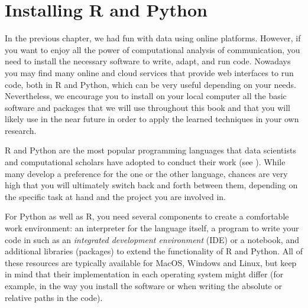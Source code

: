 \section{Installing R and Python}
\label{sec:installing}

In the previous chapter, we had fun with data using online platforms.
However, if you want to enjoy all the power of computational analysis
of communication, you need to install the necessary software to write,
adapt, and run code. Nowadays you may find many online and cloud
services that provide web interfaces to run code, both in R and
Python, which can be very useful depending on your
needs. Nevertheless, we encourage you to install on your local
computer all the basic software and packages that we will use
throughout this book and that you will likely use in the near future
in order to apply the learned techniques in your own research.

R and Python are the most popular programming languages that data
scientists and computational scholars have adopted to conduct their
work (see ). While many develop a preference
for the one or the other language, chances are very high that you
will ultimately switch back and forth between them, depending on
the specific task at hand and the project you are involved in.

For Python as well as R, you need several components to create a
comfortable work environment: an interpreter for the language itself,
a program to write your code in such as an \emph{integrated
  development environment} (IDE) or a notebook, and additional
libraries (packages) to extend the functionality of R and Python.  All
of these resources are typically available for MacOS, Windows and
Linux, but keep in mind that their implementation in each operating
system might differ (for example, in the way you install the software
or when writing the absolute or relative paths in the code).

